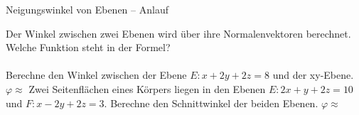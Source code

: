 \begin{aufgabe}{Neigungswinkel von Ebenen – Anlauf}
\begin{teile}
\teil Der Winkel zwischen zwei Ebenen wird über ihre Normalenvektoren berechnet. Welche Funktion steht in der Formel? \\  \\ 
\teil Berechne den Winkel zwischen der Ebene $E\colon x + 2y + 2z = 8$ und der xy-Ebene. $\varphi \approx$ \leerfeld[$^\circ$]
\teil Zwei Seitenflächen eines Körpers liegen in den Ebenen $E\colon 2x + y + 2z = 10$ und $F\colon x - 2y + 2z = 3$. Berechne den Schnittwinkel der beiden Ebenen. $\varphi \approx$ \leerfeld[$^\circ$]
\end{teile}
\end{aufgabe}

